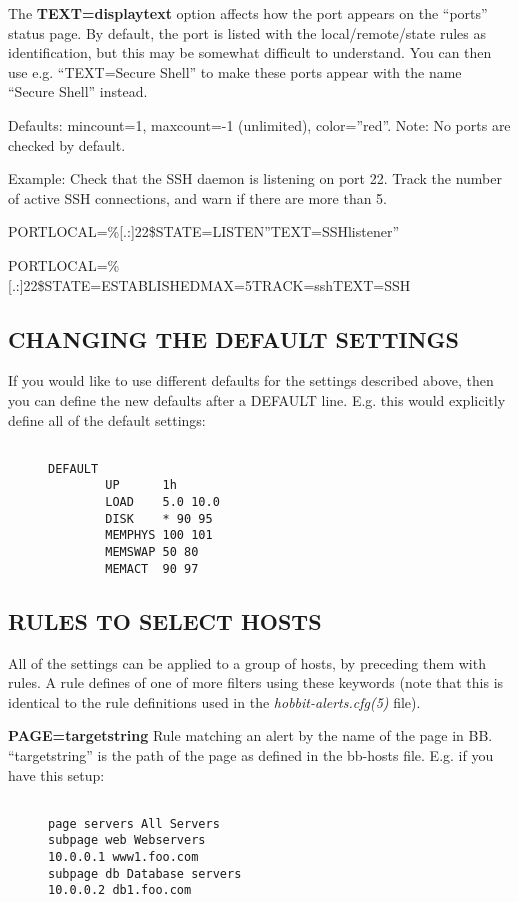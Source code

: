   The \textbf{TEXT=displaytext}
 option affects how the port appears on the ``ports'' status page. By default, the port is listed with the local/remote/state rules as identification, but this may be somewhat difficult to understand. You can then use e.g. ``TEXT=Secure Shell'' to make these ports appear with the name ``Secure Shell'' instead. 


  Defaults: mincount=1, maxcount=-1 (unlimited), color=''red''. Note: No ports are checked by default. 


  Example: Check that the SSH daemon is listening on port 22. Track the number of active SSH connections, and warn if there are more than 5.  
 
PORTLOCAL=\%[.:]22\$STATE=LISTEN''TEXT=SSHlistener''  
 
PORTLOCAL=\%[.:]22\$STATE=ESTABLISHEDMAX=5TRACK=sshTEXT=SSH 


 
\subsection{CHANGING THE DEFAULT SETTINGS}
 If you would like to use different defaults for the settings described above, then you can define the new defaults after a DEFAULT line. E.g. this would explicitly define all of the default settings: \begin{description}
\item[]\begin{verbatim}

DEFAULT
        UP      1h
        LOAD    5.0 10.0
        DISK    * 90 95
        MEMPHYS 100 101
        MEMSWAP 50 80
        MEMACT  90 97

\end{verbatim}


\end{description}


 


 
\subsection{RULES TO SELECT HOSTS}
 All of the settings can be applied to a group of hosts, by preceding them with rules. A rule defines of one of more filters using these keywords (note that this is identical to the rule definitions used in the \emph{hobbit-alerts.cfg(5)}
 file). 

 \textbf{PAGE=targetstring}
 Rule matching an alert by the name of the page in
 BB. ``targetstring'' is the path of the page as defined in the
 bb-hosts file. E.g. if you have this setup: \begin{description}

\item[]\begin{verbatim}

page servers All Servers
subpage web Webservers
10.0.0.1 www1.foo.com
subpage db Database servers
10.0.0.2 db1.foo.com

\end{verbatim}


\end{description}



